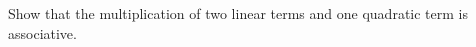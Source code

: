 
\begin{exercise}
Show that the multiplication of two linear terms and one quadratic term is associative.
\end{exercise}

